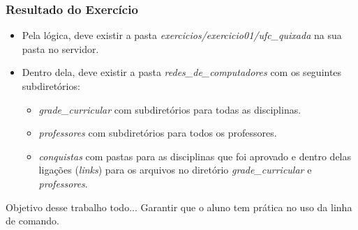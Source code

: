 \documentclass{beamer}
\begin{document}
   \begin{frame}
      \frametitle{Resultado do Exercício}
      \begin{itemize}
         \item Pela lógica, deve existir a pasta \textit{exercicios/exercicio01/ufc\_quixada} na sua pasta no servidor.
         \item Dentro dela, deve existir a pasta \textit{redes\_de\_computadores} com os seguintes subdiretórios:
         \begin{itemize}
            \item \textit{grade\_curricular} com subdiretórios para todas as disciplinas.
	         \item \textit{professores} com subdiretórios para todos os professores.
	         \item \textit{conquistas} com pastas para as disciplinas que foi aprovado e dentro delas ligações (\textit{links}) para os arquivos no diretório \textit{grade\_curricular} e \textit{professores}.  
         \end{itemize}
      \end{itemize}
      \begin{block}{Objetivo desse trabalho todo...}
      Garantir que o aluno tem prática no uso da linha de comando.
      \end{block}
   \end{frame}
\end{document}

